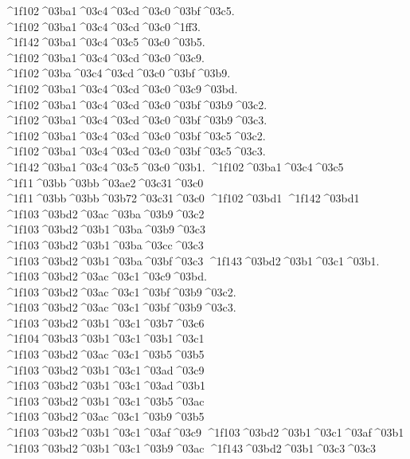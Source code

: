 {^^^^1f102^^^^03ba1^^^^03c4^^^^03cd^^^^03c0^^^^03bf^^^^03c5.
^^^^1f102^^^^03ba1^^^^03c4^^^^03cd^^^^03c0^^^^1ff3.
^^^^1f142^^^^03ba1^^^^03c4^^^^03c5^^^^03c0^^^^03b5.
^^^^1f102^^^^03ba1^^^^03c4^^^^03cd^^^^03c0^^^^03c9.
^^^^1f102^^^^03ba^^^^03c4^^^^03cd^^^^03c0^^^^03bf^^^^03b9.
^^^^1f102^^^^03ba1^^^^03c4^^^^03cd^^^^03c0^^^^03c9^^^^03bd.
^^^^1f102^^^^03ba1^^^^03c4^^^^03cd^^^^03c0^^^^03bf^^^^03b9^^^^03c2.
^^^^1f102^^^^03ba1^^^^03c4^^^^03cd^^^^03c0^^^^03bf^^^^03b9^^^^03c3.
^^^^1f102^^^^03ba1^^^^03c4^^^^03cd^^^^03c0^^^^03bf^^^^03c5^^^^03c2.
^^^^1f102^^^^03ba1^^^^03c4^^^^03cd^^^^03c0^^^^03bf^^^^03c5^^^^03c3.
^^^^1f142^^^^03ba1^^^^03c4^^^^03c5^^^^03c0^^^^03b1.
^^^^1f102^^^^03ba1^^^^03c4^^^^03c5
^^^^1f11^^^^03bb^^^^03bb^^^^03ae2^^^^03c31^^^^03c0 		%
^^^^1f11^^^^03bb^^^^03bb^^^^03b72^^^^03c31^^^^03c0
^^^^1f102^^^^03bd1
^^^^1f142^^^^03bd1
	^^^^1f103^^^^03bd2^^^^03ac^^^^03ba^^^^03b9^^^^03c2 		%
	^^^^1f103^^^^03bd2^^^^03b1^^^^03ba^^^^03b9^^^^03c3  		%
	^^^^1f103^^^^03bd2^^^^03b1^^^^03ba^^^^03cc^^^^03c3 		%
	^^^^1f103^^^^03bd2^^^^03b1^^^^03ba^^^^03bf^^^^03c3
	^^^^1f143^^^^03bd2^^^^03b1^^^^03c1^^^^03b1.   		%
	^^^^1f103^^^^03bd2^^^^03ac^^^^03c1^^^^03c9^^^^03bd.
	^^^^1f103^^^^03bd2^^^^03ac^^^^03c1^^^^03bf^^^^03b9^^^^03c2.
	^^^^1f103^^^^03bd2^^^^03ac^^^^03c1^^^^03bf^^^^03b9^^^^03c3.
	^^^^1f103^^^^03bd2^^^^03b1^^^^03c1^^^^03b7^^^^03c6   		%
		^^^^1f104^^^^03bd3^^^^03b1^^^^03c1^^^^03b1^^^^03c1 		%
	^^^^1f103^^^^03bd2^^^^03ac^^^^03c1^^^^03b5^^^^03b5  		%
	^^^^1f103^^^^03bd2^^^^03b1^^^^03c1^^^^03ad^^^^03c9
	^^^^1f103^^^^03bd2^^^^03b1^^^^03c1^^^^03ad^^^^03b1  		%
	^^^^1f103^^^^03bd2^^^^03b1^^^^03c1^^^^03b5^^^^03ac
	^^^^1f103^^^^03bd2^^^^03ac^^^^03c1^^^^03b9^^^^03b5  		%
	^^^^1f103^^^^03bd2^^^^03b1^^^^03c1^^^^03af^^^^03c9
	^^^^1f103^^^^03bd2^^^^03b1^^^^03c1^^^^03af^^^^03b1  		%
	^^^^1f103^^^^03bd2^^^^03b1^^^^03c1^^^^03b9^^^^03ac
	^^^^1f143^^^^03bd2^^^^03b1^^^^03c3^^^^03c3  		%
}
